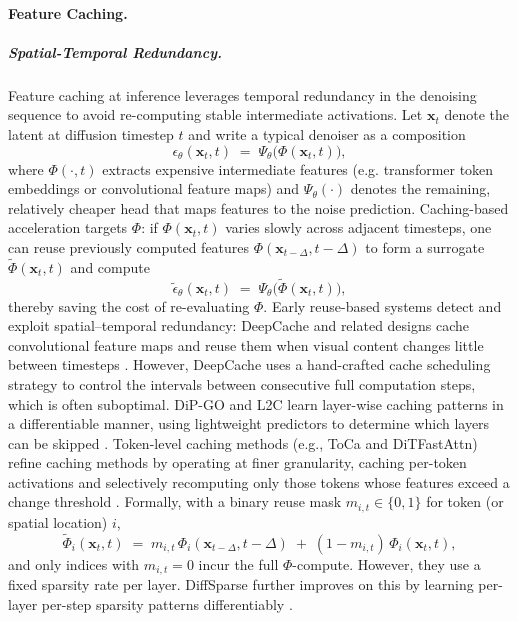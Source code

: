 \paragraph{Feature Caching.}
\label{subsubsec:caching}

\subparagraph{Spatial-Temporal Redundancy.}
Feature caching at inference leverages temporal redundancy in the denoising sequence to avoid re-computing stable intermediate activations. Let \(\mathbf{x}_t\) denote the latent at diffusion timestep \(t\) and write a typical denoiser as a composition
\begin{equation}
\epsilon_{\theta}(\mathbf{x}_t,t) \;=\; \Psi_\theta\big(\Phi(\mathbf{x}_t,t)\big),
\label{eq:denoiser-decomp}
\end{equation}
where \(\Phi(\cdot,t)\) extracts expensive intermediate features (e.g. transformer token embeddings or convolutional feature maps) and \(\Psi_\theta(\cdot)\) denotes the remaining, relatively cheaper head that maps features to the noise prediction. Caching-based acceleration targets \(\Phi\): if \(\Phi(\mathbf{x}_t,t)\) varies slowly across adjacent timesteps, one can reuse previously computed features \(\Phi(\mathbf{x}_{t-\Delta},t-\Delta)\) to form a surrogate \(\tilde{\Phi}(\mathbf{x}_t,t)\) and compute
\[
\tilde{\epsilon}_\theta(\mathbf{x}_t,t) \;=\; \Psi_\theta\big(\tilde{\Phi}(\mathbf{x}_t,t)\big),
\]
thereby saving the cost of re-evaluating \(\Phi\). Early reuse-based systems detect and exploit spatial–temporal redundancy: DeepCache and related designs cache convolutional feature maps and reuse them when visual content changes little between timesteps \citep{ma2024deepcache}. 
However, DeepCache uses a hand-crafted cache scheduling strategy to control the intervals between consecutive full computation steps, which is often suboptimal. 
DiP-GO and L2C learn layer-wise caching patterns in a differentiable manner, using lightweight predictors to determine which layers can be skipped \citep{zhu2024dip, ma2024learning}. Token-level caching methods (e.g., ToCa and DiTFastAttn) refine caching methods by operating at finer granularity, caching per-token activations and selectively recomputing only those tokens whose features exceed a change threshold \citep{chen2024delta-dit,liu2024timestep,zou2024accelerating, yuan2024ditfastattn}. 
Formally, with a binary reuse mask \(m_{i,t}\in\{0,1\}\) for token (or spatial location) \(i\),
\begin{equation}
\tilde{\Phi}_i(\mathbf{x}_t,t) \;=\; m_{i,t}\,\Phi_i(\mathbf{x}_{t-\Delta},t-\Delta)\;+\;(1-m_{i,t})\,\Phi_i(\mathbf{x}_t,t),
\end{equation}
and only indices with \(m_{i,t}=0\) incur the full \(\Phi\)-compute.
However, they use a fixed sparsity rate per layer. DiffSparse further improves on this by learning per-layer per-step sparsity patterns differentiably \citep{zhu2026diffsparse}.

